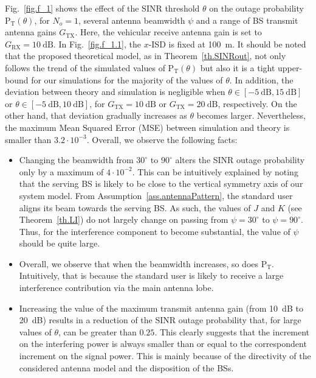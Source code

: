 \documentclass[10pt,journal,a4paper]{IEEEtran}
\begin{document}
Fig.~\ref{fig.f_1} shows the effect of the SINR threshold $\theta$ on the outage probability $\mathrm{P}_{\mathrm{T}}(\theta)$, for $N_o = 1$, several antenna beamwidth $\psi$ and a range of BS transmit antenna gains $G_{\mathrm{TX}}$. Here, the vehicular receive antenna gain is set to $G_{\mathrm{RX}} = \SI{10}{\dB}$. In Fig.~\ref{fig.f_1.1}, the $x$-ISD is fixed at \SI{100}{\meter}. It should be noted that the proposed theoretical model, as in Theorem~\ref{th.SINRout}, not only follows the trend of the simulated values of $\mathrm{P}_{\mathrm{T}}(\theta)$ but also it is a tight upper-bound for our simulations for the majority of the values of $\theta$. In addition, the deviation between theory and simulation is negligible when $\theta \in [\SI{-5}{\dB}, \SI{15}{\dB}]$ or $\theta \in [\SI{-5}{\dB}, \SI{10}{\dB}]$, for $G_{\mathrm{TX}} = \SI{10}{\dB}$ or $G_{\mathrm{TX}} = \SI{20}{\dB}$, respectively. On the other hand, that deviation gradually increases as $\theta$ becomes larger. Nevertheless, the maximum Mean Squared Error (MSE) between simulation and theory is smaller than $3.2 \cdot 10^{-3}$. Overall, we observe the following facts:
\begin{itemize}
\item Changing the beamwidth from $30^\circ$ to $90^\circ$ alters the SINR outage probability only by a maximum of $4 \cdot 10^{-2}$. This can be intuitively explained by noting that the serving BS is likely to be close to the vertical symmetry axis of our system model. From Assumption~\ref{ass.antennaPattern}, the standard user aligns its beam towards the serving BS. As such, the values of $J$ and $K$ (see Theorem~\ref{th.LI}) do not largely change on passing from $\psi = 30^\circ$ to $\psi = 90^\circ$. Thus, for the interference component to become substantial, the value of $\psi$ should be quite large.
\item Overall, we observe that when the beamwidth increases, so does $\mathrm{P}_{\mathrm{T}}$. Intuitively, that is because the standard user is likely to receive a large interference contribution via the main antenna lobe.
\item Increasing the value of the maximum transmit antenna gain (from \SI{10}{\dB} to \SI{20}{\dB}) results in a reduction of the SINR outage probability that, for large values of $\theta$, can be greater than $0.25$. This clearly suggests that the increment on the interfering power is always smaller than or equal to the correspondent increment on the signal power. This is mainly because of the directivity of the considered antenna model and the disposition of the BSs.
\end{itemize}
\end{document}
